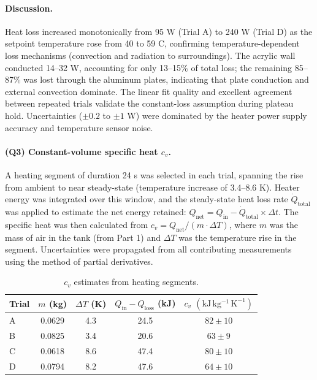 \documentclass[12pt]{article}
\begin{document}
\paragraph{Discussion.} Heat loss increased monotonically from 95 W (Trial A) to 240 W (Trial D) as the setpoint temperature rose from 40 to 59 \textdegree C, confirming temperature-dependent loss mechanisms (convection and radiation to surroundings). The acrylic wall conducted 14–32 W, accounting for only 13–15\% of total loss; the remaining 85–87\% was lost through the aluminum plates, indicating that plate conduction and external convection dominate. The linear fit quality and excellent agreement between repeated trials validate the constant-loss assumption during plateau hold. Uncertainties ($\pm 0.2$ to $\pm 1$ W) were dominated by the heater power supply accuracy and temperature sensor noise.

\paragraph{(Q3) Constant-volume specific heat $c_v$.} A heating segment of duration 24 s was selected in each trial, spanning the rise from ambient to near steady-state (temperature increase of 3.4–8.6 K). Heater energy was integrated over this window, and the steady-state heat loss rate $\dot{Q}_{\text{total}}$ was applied to estimate the net energy retained: $Q_{\text{net}} = Q_{\text{in}} - \dot{Q}_{\text{total}} \times \Delta t$. The specific heat was then calculated from $c_v = Q_{\text{net}} / (m \cdot \Delta T)$, where $m$ was the mass of air in the tank (from Part 1) and $\Delta T$ was the temperature rise in the segment. Uncertainties were propagated from all contributing measurements using the method of partial derivatives.


\begin{table}[H]\centering
\caption{$c_v$ estimates from heating segments.}
\label{tab:cv}
\begin{tabular}{@{}lcccc@{}}
\toprule
Trial & $m$ (kg) & $\Delta T$ (K) & $Q_{\text{in}}-Q_{\text{loss}}$ (kJ) & $c_v$ $(\mathrm{kJ\,kg^{-1}\,K^{-1}})$ \\
\midrule
A & 0.0629 & 4.3 & 24.5 & $82 \pm 10$ \\
B & 0.0825 & 3.4 & 20.6 & $63 \pm 9$ \\
C & 0.0618 & 8.6 & 47.4 & $80 \pm 10$ \\
D & 0.0794 & 8.2 & 47.6 & $64 \pm 10$ \\
\bottomrule
\end{tabular}
\end{table}
\end{document}
